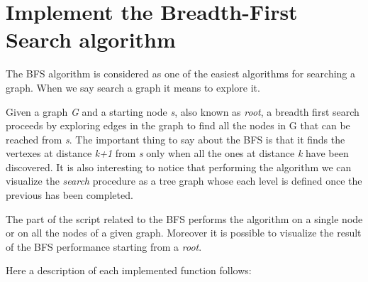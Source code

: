 \documentclass[10pt,a4paper]{article}
\begin{document}
\section{Implement the Breadth-First Search algorithm}

The BFS algorithm is considered as one of the easiest algorithms for searching a graph. When we say search a graph it means to explore it.

Given a graph \emph{G} and a starting node \emph{s}, also known as \emph{root}, a breadth first search proceeds by exploring edges in the graph to find all the nodes in G that can be reached from \emph{s}. The important thing to say about the BFS is that it finds the vertexes at distance \emph{k+1} from \emph{s} only when all the ones at distance \emph{k} have been discovered. It is also interesting to notice that performing the algorithm we can visualize the \emph{search} procedure as a tree graph whose each level is defined once the previous has been completed. 

The part of the script related to the BFS performs the algorithm on a single node or on all the nodes of a given graph. Moreover it is possible to visualize the result of the BFS performance starting from a \emph{root}. 

Here a description of each implemented function follows:
\end{document}
